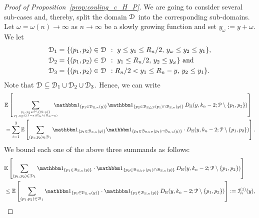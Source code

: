 \begin{proof}[Proof of Proposition~\ref{prop:couling_c_H_P}]
We are going to consider several sub-cases and, thereby, split the domain $\mathcal{D}_{}$ into the corresponding sub-domains. 
Let $\omega =\omega (n) \to \infty$ as $n\to \infty$ be a slowly growing function and set $y_\omega := y +\omega$. 
We let 
\begin{align*}
	\mathcal{D}_{1} &= \{(p_1,p_2) \in \mathcal{D}_{} \ : \ y \leq y_1 \leq R_n/2, \, y_\omega \leq y_2 \leq y_1 \},\\
	\mathcal{D}_{2} &= \{(p_1,p_2) \in \mathcal{D}_{} \ : \ y_1 \leq R_n/2, \, y_2 \leq y_\omega \} \text{ and }\\
	\mathcal{D}_{3} &=  \{(p_1,p_2) \in \mathcal{D}_{} \ : R_n/2 < y_1 \leq R_n -y, \, y_2 \leq y_1 \}.
\end{align*} 
Note that $\mathcal{D}_{} \subseteq \mathcal{D}_{1} \cup \mathcal{D}_{2}\cup \mathcal{D}_{3}$.
Hence, we can write 
\begin{equation} \label{eq:1sum-rewriting}
\begin{split} 
	&\Exp{\sum_{p_1, p_2\in \Pcal \setminus \{(0,y)\} 
	\atop y_1, y_2 \leq (1-\eps) R_n\wedge (R_n-y)} \hspace{-10pt} \ind{p_1 \in \BallHyp{y}} 
	\ind{p_2 \in \BallSym{p_1}\cap \BallHyp{y}} 
	\, D_\H (y,k_n-2;\Pcal \setminus \{p_1,p_2\})} \\ 
	&= \sum_{i=1}^3 \Exp{\sum_{(p_1, p_2)\in \dom{i}} \ind{p_1 \in \BallHyp{y}} 
	\ind{p_2 \in \BallSym{p_1}\cap \BallHyp{y}} \cdot D_\H (y,k_n-2;\Pcal \setminus \{p_1,p_2\})}.
\end{split}
\end{equation}
We bound each one of the above three summands as follows:  
\begin{equation} \label{eq:term1}
\begin{split}
	&\Exp{\sum_{(p_1, p_2)\in \dom{1}} \ind{p_1 \in \BallHyp{y}} \cdot \ind{p_2 \in \BallSym{p_1}\cap \BallHyp{y}} 
		\, D_\H (y,k_n-2;\Pcal \setminus \{p_1,p_2\})} \\
	&\le \Exp{\sum_{(p_1, p_2)\in \dom{1}} \ind{p_1 \in \BallHyp{y}} \cdot \ind{p_2 \in  \BallHyp{y}} 
		\, D_\H (y,k_n-2;\Pcal \setminus \{p_1,p_2\})} := \mathcal{I}_n^{(1)}(y),
\end{split}
\end{equation}


\end{proof}
